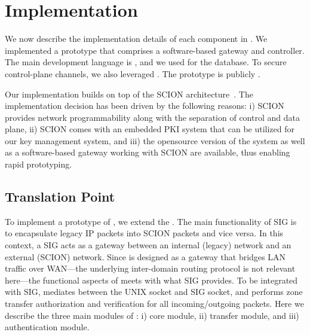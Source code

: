 \chapter{Implementation}
\label{impl}

We now describe the implementation details of each component in \name. 
We implemented a prototype that comprises a software-based gateway and controller.
The main development language is , and we used  for the database. To secure control-plane channels, we also leveraged 
. The prototype is publicly . 

Our implementation builds on top of the SCION architecture~\cite{Perrig2017}. 
The implementation decision has been driven by the following reasons: i) SCION provides 
network programmability along with the separation of control and data plane, ii) SCION comes 
with an embedded PKI system that can be utilized for our key management system, and 
iii) the opensource version of the  system as well as a 
software-based gateway working with SCION are available, thus enabling rapid prototyping. 


\section{Translation Point}
\label{sec:tp}

To implement a prototype of \tp, we extend the .
The main functionality of SIG is to encapsulate legacy IP packets into SCION packets and 
vice versa. In this context, a SIG acts as a gateway between an internal (legacy) network 
and an external (SCION) network. Since \tp is designed as a gateway that bridges LAN 
traffic over WAN---the underlying inter-domain routing protocol is not relevant here---the 
functional aspects of \tp meets with what SIG provides. To be integrated with SIG, \tp
mediates between the UNIX socket and SIG socket, and performs zone transfer authorization 
and verification for all incoming/outgoing packets. 
Here we describe the three main modules of \tp: i) core module, ii) transfer module, and iii) authentication module. 


